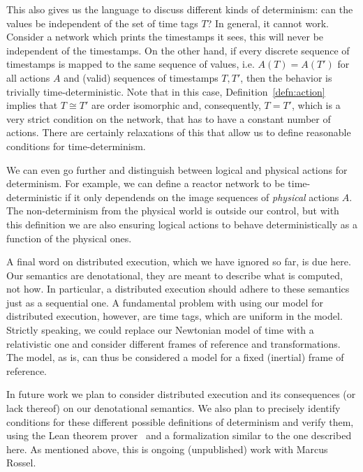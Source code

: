 This also gives us the language to discuss different kinds of determinism: can the values be independent of the set of time tags $T$?
In general, it cannot work. Consider a network which prints the timestamps it sees, this will never be independent of the timestamps.
On the other hand, if every discrete sequence of timestamps is mapped to the same sequence of values, i.e. $A(T) = A(T')$ for all actions $A$ and (valid) sequences of timestamps $T, T'$, then the behavior is trivially time-deterministic.
Note that in this case, Definition~\ref{defn:action} implies that $T \cong T'$ are order isomorphic and, consequently, $T = T'$, which is a very strict condition on the network, that has to have a constant number of actions.
There are certainly relaxations of this that allow us to define reasonable conditions for time-determinism.

We can even go further and distinguish between logical and physical actions for determinism. 
For example, we can define a reactor network to be time-deterministic if it only dependends on the image sequences of \emph{physical} actions $A$.
The non-determinism from the physical world is outside our control, but with this definition we are also ensuring logical actions to behave deterministically as a function of the physical ones. 

A final word on distributed execution, which we have ignored so far, is due here. 
Our semantics are denotational, they are meant to describe what is computed, not how. 
In particular, a distributed execution should adhere to these semantics just as a sequential one.
A fundamental problem with using our model for distributed execution, however, are time tags, which are uniform in the model.
Strictly speaking, we could replace our Newtonian model of time with a relativistic one and consider different frames of reference and transformations. 
The model, as is, can thus be considered a model for a fixed (inertial) frame of reference.

In future work we plan to consider distributed execution and its consequences (or lack thereof) on our denotational semantics. 
We also plan to precisely identify conditions for these different possible definitions of determinism and verify them, using the Lean theorem prover~\cite{lean} and a formalization similar to the one described here.
As mentioned above, this is ongoing (unpublished) work with Marcus Rossel.